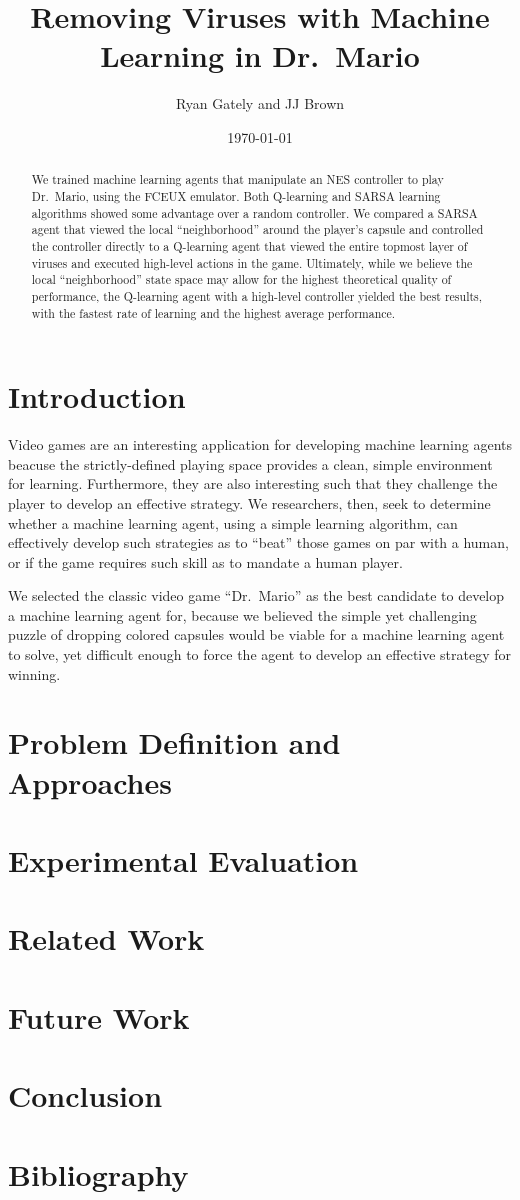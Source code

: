 \documentclass[letterpaper]{article} %
\author{Ryan Gately and JJ Brown}
\date{\today}
\title{Removing Viruses with Machine Learning in Dr.~Mario}
\begin{document}
\maketitle

\begin{abstract}
We trained machine learning agents that manipulate an NES controller to play Dr.~Mario\cite{drmario90}, using the FCEUX emulator\cite{fceux18}.
Both Q-learning and SARSA learning algorithms showed some advantage over a random controller.
We compared a SARSA agent that viewed the local ``neighborhood'' around the player's capsule and controlled the controller directly to a Q-learning agent that viewed the entire topmost layer of viruses and executed high-level actions in the game. Ultimately, while we believe the local ``neighborhood'' state space may allow for the highest theoretical quality of performance, the Q-learning agent with a high-level controller yielded the best results, with the fastest rate of learning and the highest average performance.
\end{abstract}

\section{Introduction}
Video games are an interesting application for developing machine learning agents beacuse the strictly-defined playing space provides a clean, simple environment for learning. Furthermore, they are also interesting such that they challenge the player to develop an effective strategy. We researchers, then, seek to determine whether a machine learning agent, using a simple learning algorithm, can effectively develop such strategies as to ``beat'' those games on par with a human, or if the game requires such skill as to mandate a human player.

We selected the classic video game ``Dr.~Mario''\cite{drmario90} as the best candidate to develop a machine learning agent for, because we believed the simple yet challenging puzzle of dropping colored capsules would be viable for a machine learning agent to solve, yet difficult enough to force the agent to develop an effective strategy for winning.


\section{Problem Definition and Approaches}

\section{Experimental Evaluation}

\section{Related Work}

\section{Future Work}

\section{Conclusion}

\newpage
\section{Bibliography}


\end{document}
